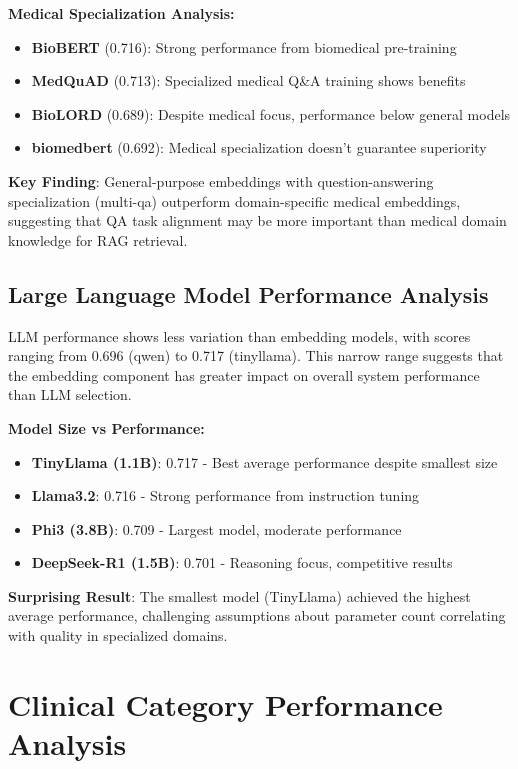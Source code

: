 \textbf{Medical Specialization Analysis:}
\begin{itemize}
    \item \textbf{BioBERT} (0.716): Strong performance from biomedical pre-training
    \item \textbf{MedQuAD} (0.713): Specialized medical Q\&A training shows benefits
    \item \textbf{BioLORD} (0.689): Despite medical focus, performance below general models
    \item \textbf{biomedbert} (0.692): Medical specialization doesn't guarantee superiority
\end{itemize}

\textbf{Key Finding}: General-purpose embeddings with question-answering specialization (multi-qa) outperform domain-specific medical embeddings, suggesting that QA task alignment may be more important than medical domain knowledge for RAG retrieval.

\subsection{Large Language Model Performance Analysis}

LLM performance shows less variation than embedding models, with scores ranging from 0.696 (qwen) to 0.717 (tinyllama). This narrow range suggests that the embedding component has greater impact on overall system performance than LLM selection.

\textbf{Model Size vs Performance:}
\begin{itemize}
    \item \textbf{TinyLlama (1.1B)}: 0.717 - Best average performance despite smallest size
    \item \textbf{Llama3.2}: 0.716 - Strong performance from instruction tuning
    \item \textbf{Phi3 (3.8B)}: 0.709 - Largest model, moderate performance
    \item \textbf{DeepSeek-R1 (1.5B)}: 0.701 - Reasoning focus, competitive results
\end{itemize}

\textbf{Surprising Result}: The smallest model (TinyLlama) achieved the highest average performance, challenging assumptions about parameter count correlating with quality in specialized domains.

\section{Clinical Category Performance Analysis}

